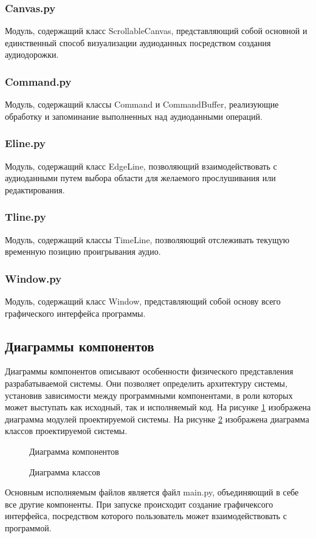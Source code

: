 \subsubsection{Canvas.py}
Модуль, содержащий класс ScrollableCanvas, представляющий собой основной и единственный способ визуализации аудиоданных посредством создания аудиодорожки.

\subsubsection{Command.py}
Модуль, содержащий классы Command и CommandBuffer, реализующие обработку и запоминание выполненных над аудиоданными операций.

\subsubsection{Eline.py}
Модуль, содержащий класс EdgeLine, позволяющий взаимодействовать с аудиоданными путем выбора области для желаемого прослушивания или редактирования.

\subsubsection{Tline.py}
Модуль, содержащий классы TimeLine, позволяющий отслеживать текущую временную позицию проигрывания аудио.

\subsubsection{Window.py}
Модуль, содержащий класс Window, представляющий собой основу всего графического интерфейса программы.

\subsection{Диаграммы компонентов}
Диаграммы компонентов описывают особенности физического представления разрабатываемой системы. Они позволяет определить архитектуру системы, установив зависимости между программными компонентами, в роли которых может выступать как исходный, так и исполняемый код. На рисунке \ref{diagram_comp:image} изображена диаграмма модулей проектируемой системы. На рисунке \ref{diagram_class:image} изображена диаграмма классов проектируемой системы.

\begin{figure}[ht]
	\caption{Диаграмма компонентов}
	\label{diagram_comp:image}
\end{figure}

\begin{figure}[ht]
	\caption{Диаграмма классов}
	\label{diagram_class:image}
\end{figure}

Основным исполняемым файлов является файл main.py, объединяющий в себе все другие компоненты. При запуске происходит создание графичексого интерфейса, посредством которого пользователь может взаимодействовать с программой. 